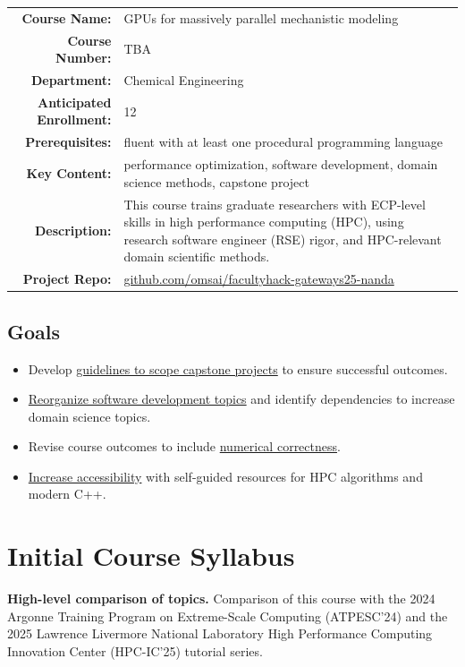 \documentclass[
portrait,
custom
]{sciposter}
\begin{document}
\begin{multicols}{2}
  {
    \begin{tabularx}{\linewidth}{>{\bfseries}r X}
      \toprule
      Course Name:
      & GPUs for massively parallel mechanistic modeling\\
      Course Number:
      & TBA\\
      Department:
      & Chemical Engineering\\
      Anticipated Enrollment:
      & 12\\
      Prerequisites:
      & fluent with at least one %
      procedural programming language\\
      Key Content:
      & performance optimization, %
      software development, %
      domain science methods, %
      capstone project\\
      Description:
      & This course trains graduate researchers %
      with ECP-level skills in high performance computing (HPC), %
      using research software engineer (RSE) rigor, %
      and HPC-relevant domain scientific methods.\\
      Project Repo:
      & \small \url{github.com/omsai/facultyhack-gateways25-nanda}\\
      \bottomrule
    \end{tabularx}
    \medskip
  }

  \subsection*{Goals}
  \begin{itemize}
  \item Develop \ul{guidelines %
    to scope capstone projects} %
    to ensure successful outcomes.
  \item \ul{Reorganize software development topics} %
    and identify dependencies %
    to increase domain science topics.
  \item Revise course outcomes %
    to include \ul{numerical correctness}.
  \item \ul{Increase accessibility} with self-guided resources %
    for HPC algorithms and modern C++.
  \end{itemize}

  \section*{Initial Course Syllabus}
    \textbf{High-level comparison of topics.}
        Comparison of this course with the %
        2024 Argonne Training Program on Extreme-Scale Computing (ATPESC'24) %
        and the 2025 Lawrence Livermore National Laboratory %
        High Performance Computing Innovation Center (HPC-IC'25) %
        tutorial series.
        \medskip


\end{multicols}
\end{document}
